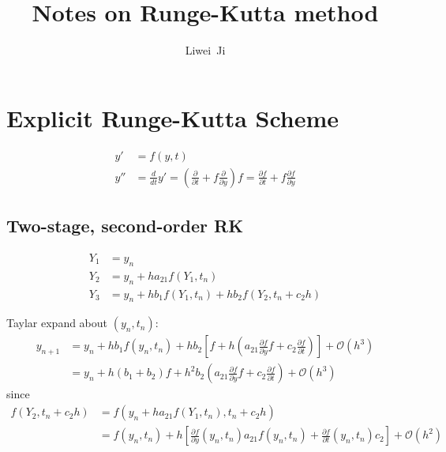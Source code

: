 \documentclass[prd,aps,a4paper,superscriptaddress,onecolumn,footinbib]{revtex4}
\begin{document}
\title{Notes on Runge-Kutta method}

\author{Liwei~Ji}

\maketitle

\tableofcontents



\section{Explicit Runge-Kutta Scheme}

\begin{align}
    y'
    &=f(y,t)
    \\
    y''
    &=\frac{d}{dt}y'
    =\left(\frac{\partial}{\partial t}+f\frac{\partial}{\partial y}\right)f
    =\frac{\partial f}{\partial t}+f\frac{\partial f}{\partial y}
\end{align}

\subsection{Two-stage, second-order RK}

\begin{align}
    Y_1&=y_n \\
    Y_2&=y_n+h a_{21}f(Y_1, t_n) \\
    Y_3&=y_n+h b_1f(Y_1, t_n)+h b_2f(Y_2, t_n+c_2h)
\end{align}

Taylar expand about $(y_n, t_n)$:
\begin{align}
    y_{n+1}
    &=y_n + h b_1 f(y_n, t_n) + h b_2
    \left[
        f + h
        \left(
            a_{21} \frac{\partial f}{\partial y} f + c_2\frac{\partial f}{\partial t}
        \right)
    \right]
    + \mathcal{O}(h^3)
    \\
    &=y_n + h(b_1+b_2)f + h^2 b_2
    \left(a_{21}\frac{\partial f}{\partial y}f + c_2\frac{\partial f}{\partial t}\right)
    + \mathcal{O}(h^3)
\end{align}
since
\begin{align}
    f(Y_2, t_n+c_2h)
    &=f(y_n+h a_{21}f(Y_1, t_n), t_n+c_2h) \\
    &=f(y_n, t_n) + h
    \left[
        \frac{\partial f}{\partial y}(y_n, t_n) a_{21}f(y_n, t_n)
        +\frac{\partial f}{\partial t}(y_n, t_n) c_2
    \right]
    + \mathcal{O}(h^2)
\end{align}
\end{document}
